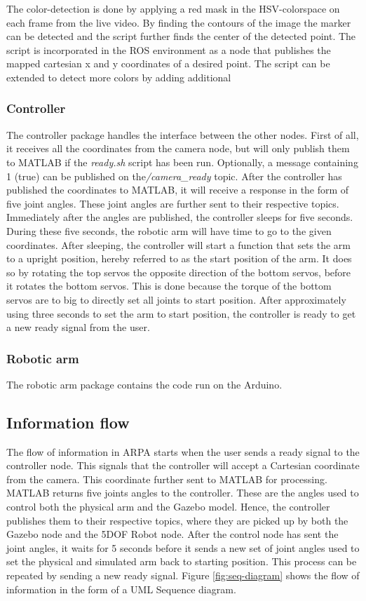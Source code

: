 \documentclass[11pt,a4paper, titlepage]{article}
\begin{document}
The color-detection is done by applying a red mask in the HSV-colorspace on each frame from the live video. By finding the contours of the image the marker can be detected and the script further finds the center of the detected point. The script is incorporated in the ROS environment as a node that publishes the mapped cartesian x and y coordinates of a desired point. The script can be extended to detect more colors by adding additional

\subsubsection{Controller}
The controller package handles the interface between the other nodes. First of all, it receives all the coordinates from the camera node, but will only publish them to MATLAB if the \textit{ready.sh} script has been run. Optionally, a message containing 1 (true) can be published on the\textit{/camera\_ready} topic. After the controller has published the coordinates to MATLAB, it will receive a response in the form of five joint angles. These joint angles are further sent to their respective topics. Immediately after the angles are published, the controller sleeps for five seconds. During these five seconds, the robotic arm will have time to go to the given coordinates. After sleeping, the controller will start a function that sets the arm to a upright position, hereby referred to as the start position of the arm. It does so by rotating the top servos the opposite direction of the bottom servos, before it rotates the bottom servos. This is done because the torque of the bottom servos are to big to directly set all joints to start position. After approximately using three seconds to set the arm to start position, the controller is ready to get a new ready signal from the user.

\subsubsection{Robotic arm}
The robotic arm package contains the code run on the Arduino.
	
	
	
	\subsection{Information flow}
	
	The flow of information in ARPA starts when the user sends a ready signal to the controller node. This signals that the controller will accept a Cartesian coordinate from the camera. This coordinate  further sent to MATLAB for processing. MATLAB returns five joints angles to the controller. These are the angles used to control both the physical arm and the Gazebo model. Hence, the controller publishes them to their respective topics, where they are picked up by both the Gazebo node and the 5DOF Robot node. After the control node has sent the joint angles, it waits for 5 seconds before it sends a new set of joint angles used to set the physical and simulated arm back to starting position. This process can be repeated by sending a new ready signal. Figure \ref{fig:seq-diagram} shows the flow of information in the form of a UML Sequence diagram.
	
\end{document}
